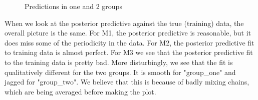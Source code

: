 \documentclass{article}
\begin{document}
\begin{figure}[ht]
    \centering
    \quad
    \quad
    \caption{Predictions in one and 2 groups}
\end{figure}

When we look at the posterior predictive against the true (training) data, the overall picture is the same. For M1, the posterior predictive is reasonable, but it does miss some of the periodicity in the data. 
For M2, the posterior predictive fit to training data is almost perfect.
For M3 we see that the posterior predictive fit to the training data is pretty bad. 
More disturbingly, we see that the fit is qualitatively different for the two groups. 
It is smooth for "group\_one" and jagged for "group\_two". We believe that this is because of badly mixing chains, 
which are being averaged before making the plot. 
\end{document}
